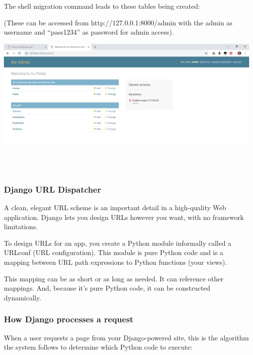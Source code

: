 \documentclass[10pt]{article}
\begin{document}
 
The shell migration command leads to these tables being created:

(These can be accessed from http://127.0.0.1:8000/admin with the admin as username and “pass1234” as password for admin access).

\begin{center}
\includegraphics[width=1.1\textwidth]{p3.png}
\end{center} \\ \\

\subsubsection{Django URL  Dispatcher}

A clean, elegant URL scheme is an important detail in a high-quality Web application. Django lets you design URLs however you want, with no framework limitations.

To design URLs for an app, you create a Python module informally called a URLconf (URL configuration). This module is pure Python code and is a mapping between URL path expressions to Python functions (your views).

This mapping can be as short or as long as needed. It can reference other mappings. And, because it’s pure Python code, it can be constructed dynamically.

\subsubsection{How Django processes a request}

When a user requests a page from your Django-powered site, this is the algorithm the system follows to determine which Python code to execute:
\end{document}
